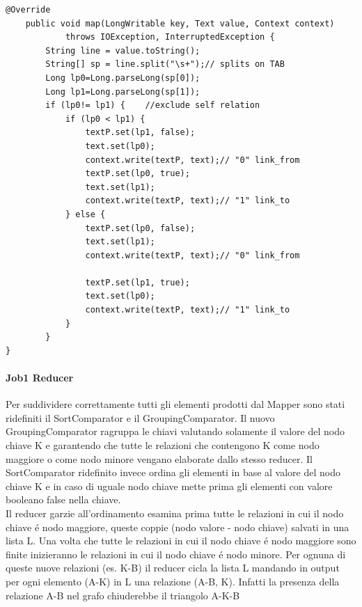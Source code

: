 \documentclass[paper=a4, fontsize=11pt]{scrartcl}	%
\numberwithin{equation}{section}															%
\numberwithin{figure}{section}																%
\numberwithin{table}{section}																%
\begin{document}
\begin{lstlisting}[label=Mapper1,caption=Implementazione del Mapper1]
@Override
	public void map(LongWritable key, Text value, Context context)
			throws IOException, InterruptedException {
		String line = value.toString();
		String[] sp = line.split("\s+");// splits on TAB
		Long lp0=Long.parseLong(sp[0]);
		Long lp1=Long.parseLong(sp[1]);
		if (lp0!= lp1) { 	//exclude self relation
			if (lp0 < lp1) {
				textP.set(lp1, false);
				text.set(lp0);
				context.write(textP, text);// "0" link_from
				textP.set(lp0, true);
				text.set(lp1);
				context.write(textP, text);// "1" link_to
			} else {
				textP.set(lp0, false);
				text.set(lp1);
				context.write(textP, text);// "0" link_from

				textP.set(lp1, true);
				text.set(lp0);
				context.write(textP, text);// "1" link_to
			}
		}
}\end{lstlisting}
\paragraph{Job1 Reducer}

Per suddividere correttamente tutti gli elementi prodotti dal Mapper sono stati ridefiniti il SortComparator e il GroupingComparator.
Il nuovo GroupingComparator ragruppa le chiavi valutando solamente il valore del nodo chiave K e garantendo che tutte le relazioni che contengono K come nodo maggiore o come nodo minore vengano elaborate dallo stesso reducer. Il SortComparator ridefinito invece ordina gli elementi in base al valore del nodo chiave K e in caso di uguale nodo chiave mette prima gli elementi con valore booleano false nella chiave.\\ Il reducer  garzie all'ordinamento esamina prima tutte le relazioni in cui il nodo chiave \'e nodo maggiore, queste coppie (nodo valore - nodo chiave) salvati in una lista L. Una volta che tutte le relazioni in cui il nodo chiave \'e nodo maggiore sono finite inizieranno le relazioni in cui il nodo chiave \'e nodo minore. Per ognuna di queste nuove relazioni (es. K-B) il reducer cicla la lista L mandando in output per ogni elemento (A-K) in L una relazione (A-B, K). Infatti la presenza della relazione A-B nel grafo chiuderebbe il triangolo A-K-B 
\end{document}
